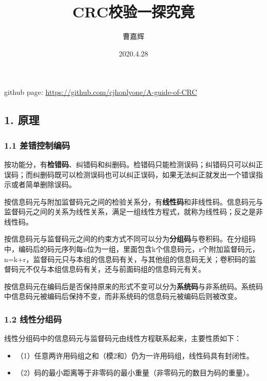 \documentclass[
]{article}
\title{\huge \textbf{CRC校验一探究竟}}
\author{曹嘉辉}
\date{2020.4.28}
\begin{document}
\maketitle

github page: \url{https://github.com/cjhonlyone/A-guide-of-CRC}

\tableofcontents

\newpage
\hypertarget{header-n3}{%
\subsection{1. 原理}\label{header-n3}}

\hypertarget{header-n4}{%
\subsubsection{1.1 差错控制编码}\label{header-n4}}

按功能分，有\textbf{检错码}、纠错码和纠删码。检错码只能检测误码；纠错码只可以纠正误码；而纠删码既可以检测误码也可以纠正误码，如果无法纠正就发出一个错误指示或者简单删除误码。

按信息码元与附加监督码元之间的检验关系分，有\textbf{线性码}和非线性码。信息码元与监督码元之间的关系为线性关系，满足一组线性方程式，就称为线性码；反之是非线性码。

按信息码元与监督码元之间的约束方式不同可以分为\textbf{分组码}与卷积码。在分组码中，编码后的码元序列每n位为一组，里面包含k个信息码元，r个附加监督码元，n=k+r，监督码元只与本组的信息码有关，与其他组的信息码无关；卷积码的监督码元不仅与本组信息码有关，还与前面码组的信息码元有关。

按信息码元在编码后是否保持原来的形式不变可以分为\textbf{系统码}与非系统码。系统码中信息码元被编码后保持不变，而非系统码的信息码元被编码后则被改变。

\hypertarget{header-n9}{%
\subsubsection{1.2 线性分组码}\label{header-n9}}

线性分组码中的信息码元与监督码元由线性方程联系起来，主要性质如下：

\begin{itemize}
\item
  （1）任意两许用码组之和（模2和）仍为一许用码组，线性码具有封闭性。
\item
  （2）码的最小距离等于非零码的最小重量（非零码元的数目为码的重量）。
\end{itemize}
\end{document}
